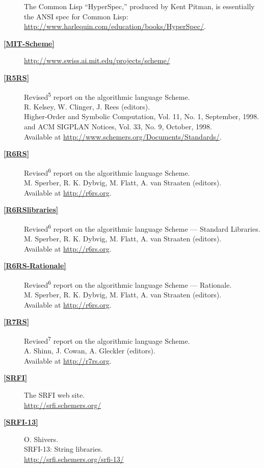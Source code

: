 \begin{description}
The Common Lisp ``HyperSpec,'' produced by Kent Pitman, is essentially
the ANSI spec for Common Lisp:
\url{http://www.harlequin.com/education/books/HyperSpec/}.
\item[\textbf{\href{}{{[}MIT-Scheme{]}}} ]
\url{http://www.swiss.ai.mit.edu/projects/scheme/}
\item[\textbf{\href{}{{[}R5RS{]}}}]
Revised\textsuperscript{5} report on the algorithmic language Scheme.\\
R. Kelsey, W. Clinger, J. Rees (editors).\\
Higher-Order and Symbolic Computation, Vol. 11, No. 1, September,
1998.\\
and ACM SIGPLAN Notices, Vol. 33, No. 9, October, 1998.\\
Available at \url{http://www.schemers.org/Documents/Standards/}.
\item[\textbf{\href{}{{[}R6RS{]}}}]
Revised\textsuperscript{6} report on the algorithmic language Scheme.\\
M. Sperber, R. K. Dybvig, M. Flatt, A. van Straaten (editors).\\
Available at \url{http://r6rs.org}.
\item[\textbf{\href{}{{[}R6RSlibraries{]}}}]
Revised\textsuperscript{6} report on the algorithmic language Scheme ---
Standard Libraries.\\
M. Sperber, R. K. Dybvig, M. Flatt, A. van Straaten (editors).\\
Available at \url{http://r6rs.org}.
\item[\textbf{\href{}{{[}R6RS-Rationale{]}}}]
Revised\textsuperscript{6} report on the algorithmic language Scheme ---
Rationale.\\
M. Sperber, R. K. Dybvig, M. Flatt, A. van Straaten (editors).\\
Available at \url{http://r6rs.org}.
\item[\textbf{\href{}{{[}R7RS{]}}}]
Revised\textsuperscript{7} report on the algorithmic language Scheme.\\
A. Shinn, J. Cowan, A. Gleckler (editors).\\
Available at \url{http://r7rs.org}.
\item[\textbf{\href{}{{[}SRFI{]}}}]
The SRFI web site.\\
\url{http://srfi.schemers.org/}
\item[\textbf{\href{}{{[}SRFI-13{]}}}]
O. Shivers.\\
SRFI-13: String libraries.\\
\url{http://srfi.schemers.org/srfi-13/}

\end{description}
